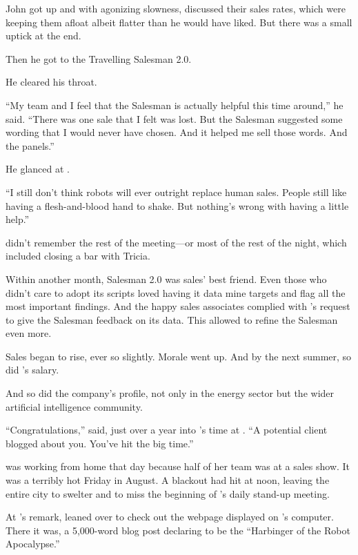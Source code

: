 John got up and with agonizing slowness, discussed their sales rates, which were keeping them afloat albeit flatter than he would have liked. But there was a small uptick at the end.

Then he got to the Travelling Salesman 2.0.

He cleared his throat.

``My team and I feel that the Salesman is actually helpful this time around,'' he said. ``There was one sale that I felt was lost. But the Salesman suggested some wording that I would never have chosen. And it helped me sell those words. And the panels.''

He glanced at {\protag}.

``I still don't think robots will ever outright replace human sales. People still like having a flesh-and-blood hand to shake. But nothing's wrong with having a little help.''

{\protag} didn't remember the rest of the meeting---or most of the rest of the night, which included closing a bar with Tricia.

\bigbreak

Within another month, Salesman 2.0 was sales' best friend. Even those who didn't care to adopt its scripts loved having it data mine targets and flag all the most important findings. And the happy sales associates complied with {\protag}'s request to give the Salesman feedback on its data. This allowed {\protag} to refine the Salesman even more.

Sales began to rise, ever so slightly. Morale went up. And by the next summer, so did {\protag}'s salary.

And so did the company's profile, not only in the energy sector but the wider artificial intelligence community.

``Congratulations,'' {\sidetag} said, just over a year into {\protag}'s time at {\energyCompany}. ``A potential client blogged about you. You've hit the big time.''

{\protag} was working from home that day because half of her team was at a sales show. It was a terribly hot Friday in August. A blackout had hit \crunchyCity{} at noon, leaving the entire city to swelter and {\protag} to miss the beginning of {\energyCompany}'s daily stand-up meeting.

At {\sidetag}'s remark, {\protag} leaned over to check out the webpage displayed on {\sidetag}'s computer. There it was, a 5,000-word blog post declaring {\energyCompany} to be the ``Harbinger of the Robot Apocalypse.''

